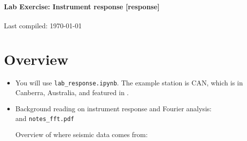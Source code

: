 \documentclass[11pt,titlepage,fleqn]{article}
\newcommand{\tfile}{{\tt lab\_response.ipynb}}
\begin{document}

\begin{spacing}{1.2}
\centering
{\large \bf Lab Exercise: Instrument response [response]} \\
\cltag\ \\
Last compiled: \today
\end{spacing}


\section{Overview}

\begin{itemize}

\item You will use \tfile. The example station is CAN, which is in Canberra, Australia, and featured in \citet[][Figure~1]{Park2005}.


\item Background reading on instrument response and Fourier analysis: \\ \citet[][Ch.~6]{SteinWysession} and \verb+notes_fft.pdf+

Overview of where seismic data comes from: \citet{RinglerBastien2020}







\end{itemize}
\end{document}
